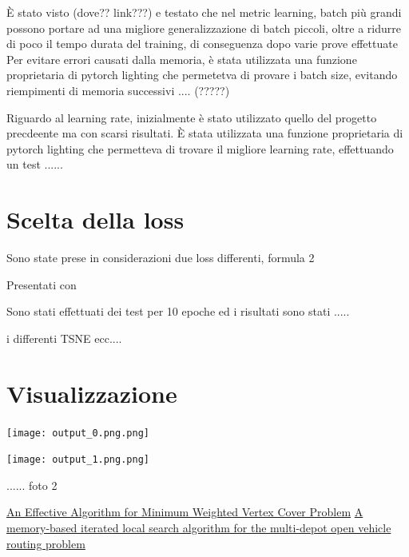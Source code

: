 \documentclass[11pt]{article}
\begin{document}
È stato visto (dove?? link???) e testato che nel metric learning, batch più grandi possono portare ad una migliore generalizzazione di batch piccoli, oltre a ridurre di poco il tempo durata del training, di conseguenza dopo varie prove effettuate
Per evitare errori causati dalla memoria, è stata utilizzata una funzione proprietaria di pytorch lighting che permetetva di provare i batch size, evitando riempimenti di memoria successivi .... (?????)


Riguardo al learning rate, inizialmente è stato utilizzato quello del progetto precdeente ma con scarsi risultati. È stata utilizzata una funzione proprietaria di pytorch lighting che permetteva di trovare il migliore learning rate, effettuando un test ......



\section{Scelta della loss}

Sono state prese in considerazioni due loss differenti, 
formula 2

Presentati con 

Sono stati effettuati dei test per 10 epoche ed i risultati sono stati .....

i differenti TSNE ecc....

\section{Visualizzazione}


\begin{center}
\begin{minipage}{0.48\linewidth}
\texttt{[image: output\_0.png.png]}
\end{minipage}%
\begin{minipage}{0.49\linewidth}
\texttt{[image: output\_1.png.png]}
\end{minipage}
\end{center}

...... foto 2



\pagebreak

\begin{thebibliography}{5}


 \href{https://www.researchgate.net/publication/242463011_An_Effective_Algorithm_for_Minimum_Weighted_Vertex_Cover_problem}{An Effective Algorithm for Minimum Weighted Vertex Cover Problem}
 \href{https://www.sciencedirect.com/science/article/abs/pii/S0377221720300278}{A memory-based iterated local search algorithm for the multi-depot open vehicle routing problem}

\end{thebibliography}


\pagebreak
\end{document}

